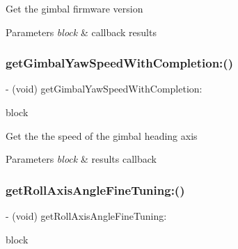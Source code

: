 Get the gimbal firmware version


\begin{DoxyParams}{Parameters}
{\em block} & callback results \\
\hline
\end{DoxyParams}
\mbox{\label{interface_p_v_gimabal_a2f1444c7c893cbea743e15eced590672}} 
\subsubsection{\texorpdfstring{get\+Gimbal\+Yaw\+Speed\+With\+Completion\+:()}{getGimbalYawSpeedWithCompletion:()}}
{\footnotesize\ttfamily -\/ (void) get\+Gimbal\+Yaw\+Speed\+With\+Completion\+: \begin{DoxyParamCaption}\item[{(void($^\wedge$)(float speed, N\+S\+Error $\ast$\+\_\+\+Nullable error))}]{block }\end{DoxyParamCaption}}

Get the the speed of the gimbal heading axis


\begin{DoxyParams}{Parameters}
{\em block} & results callback \\
\hline
\end{DoxyParams}
\mbox{\label{interface_p_v_gimabal_ae4e3e7f2c3e3672a56bd67a8b9212aea}} 
\subsubsection{\texorpdfstring{get\+Roll\+Axis\+Angle\+Fine\+Tuning\+:()}{getRollAxisAngleFineTuning:()}}
{\footnotesize\ttfamily -\/ (void) get\+Roll\+Axis\+Angle\+Fine\+Tuning\+: \begin{DoxyParamCaption}\item[{(void($^\wedge$)(float angle, N\+S\+Error $\ast$\+\_\+\+Nullable error))}]{block }\end{DoxyParamCaption}}

